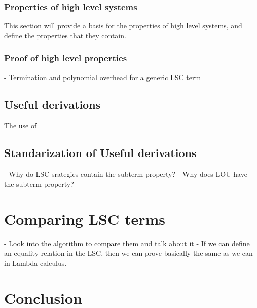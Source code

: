 \documentclass[12pt]{article}
\begin{document}
\subsubsection{Properties of high level systems}
This section will provide a basis for the properties of high level systems, and define the properties that they contain.
\subsubsection{Proof of high level properties}
- Termination and polynomial overhead for a generic LSC term
\subsection{Useful derivations}
The use of
\subsection{Standarization of Useful derivations}
- Why do LSC srategies contain the subterm property?
- Why does LOU have the subterm property?
\section{Comparing LSC terms}
- Look into the algorithm to compare them and talk about it
- If we can define an equality relation in the LSC, then we can prove basically the same as we can in Lambda calculus.
\section{Conclusion}
\printbibliography
\end{document}
